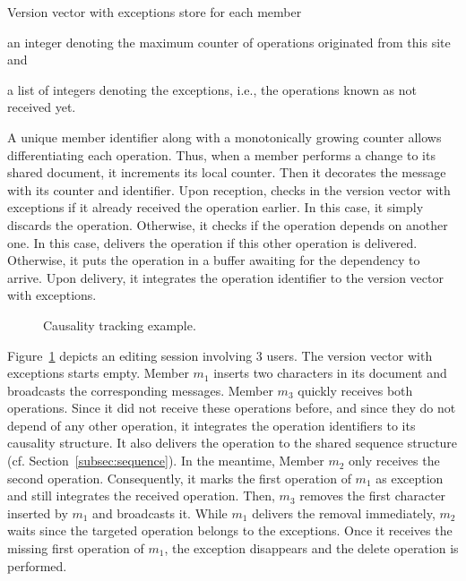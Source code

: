 \begin{asparadesc}
\item [Version vector with exceptions] store for each member
  \begin{inparaenum}[(i)]
  \item an integer denoting the maximum counter of operations originated from
    this site and
  \item a list of integers denoting the exceptions, i.e., the operations known
    as not received yet.
  \end{inparaenum}
  
  A unique member identifier along with a monotonically growing counter allows
  differentiating each operation. Thus, when a member performs a change to its
  shared document, it increments its local counter. Then it decorates the
  message with its counter and identifier. Upon reception, \CRATE checks in the
  version vector with exceptions if it already received the operation
  earlier. In this case, it simply discards the operation.  Otherwise, it checks
  if the operation depends on another one. In this case, \CRATE delivers the
  operation if this other operation is delivered. Otherwise, it puts the
  operation in a buffer awaiting for the dependency to arrive. Upon delivery, it
  integrates the operation identifier to the version vector with exceptions.

  \begin{figure}
    
    \caption{\label{fig:timeline} Causality tracking example.}
  \end{figure}

  Figure~\ref{fig:timeline} depicts an editing session involving 3 users. The
  version vector with exceptions starts empty. Member $m_1$ inserts two
  characters in its document and broadcasts the corresponding messages. Member
  $m_3$ quickly receives both operations. Since it did not receive these
  operations before, and since they do not depend of any other operation, it
  integrates the operation identifiers to its causality structure. It also
  delivers the operation to the shared sequence structure
  (cf. Section~\ref{subsec:sequence}). In the meantime, Member $m_2$ only
  receives the second operation. Consequently, it marks the first operation of
  $m_1$ as exception and still integrates the received operation. Then, $m_3$
  removes the first character inserted by $m_1$ and broadcasts it. While $m_1$
  delivers the removal immediately, $m_2$ waits since the targeted operation
  belongs to the exceptions. Once it receives the missing first operation of
  $m_1$, the exception disappears and the delete operation is performed.


\end{asparadesc}

